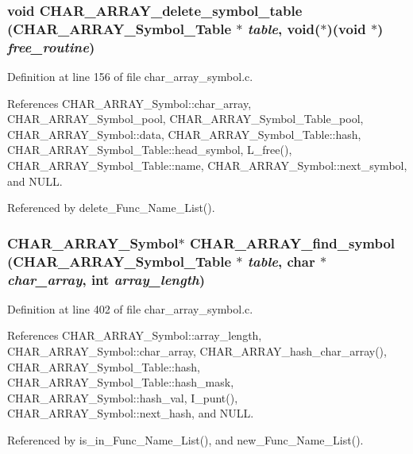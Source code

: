 \subsubsection{\setlength{\rightskip}{0pt plus 5cm}void CHAR\_\-ARRAY\_\-delete\_\-symbol\_\-table (\bf{CHAR\_\-ARRAY\_\-Symbol\_\-Table} $\ast$ {\em table}, void($\ast$)(void $\ast$) {\em free\_\-routine})}\label{char__array__symbol_8h_623f7b33cd712a2c04b56b2eea7787e4}




Definition at line 156 of file char\_\-array\_\-symbol.c.

References CHAR\_\-ARRAY\_\-Symbol::char\_\-array, CHAR\_\-ARRAY\_\-Symbol\_\-pool, CHAR\_\-ARRAY\_\-Symbol\_\-Table\_\-pool, CHAR\_\-ARRAY\_\-Symbol::data, CHAR\_\-ARRAY\_\-Symbol\_\-Table::hash, CHAR\_\-ARRAY\_\-Symbol\_\-Table::head\_\-symbol, L\_\-free(), CHAR\_\-ARRAY\_\-Symbol\_\-Table::name, CHAR\_\-ARRAY\_\-Symbol::next\_\-symbol, and NULL.

Referenced by delete\_\-Func\_\-Name\_\-List().
\subsubsection{\setlength{\rightskip}{0pt plus 5cm}\bf{CHAR\_\-ARRAY\_\-Symbol}$\ast$ CHAR\_\-ARRAY\_\-find\_\-symbol (\bf{CHAR\_\-ARRAY\_\-Symbol\_\-Table} $\ast$ {\em table}, char $\ast$ {\em char\_\-array}, int {\em array\_\-length})}\label{char__array__symbol_8h_c71b29cfaaab8587714941d516de2424}




Definition at line 402 of file char\_\-array\_\-symbol.c.

References CHAR\_\-ARRAY\_\-Symbol::array\_\-length, CHAR\_\-ARRAY\_\-Symbol::char\_\-array, CHAR\_\-ARRAY\_\-hash\_\-char\_\-array(), CHAR\_\-ARRAY\_\-Symbol\_\-Table::hash, CHAR\_\-ARRAY\_\-Symbol\_\-Table::hash\_\-mask, CHAR\_\-ARRAY\_\-Symbol::hash\_\-val, I\_\-punt(), CHAR\_\-ARRAY\_\-Symbol::next\_\-hash, and NULL.

Referenced by is\_\-in\_\-Func\_\-Name\_\-List(), and new\_\-Func\_\-Name\_\-List().
